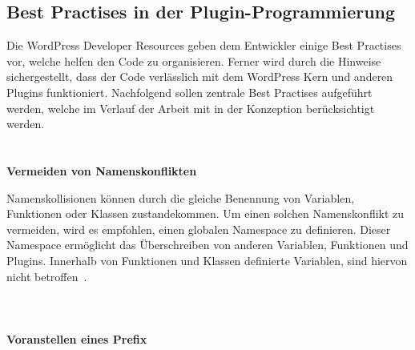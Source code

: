 \subsection{Best Practises in der Plugin-Programmierung}
Die WordPress Developer Resources geben dem Entwickler einige Best Practises vor, welche helfen den Code zu organisieren.
Ferner wird durch die Hinweise sichergestellt, dass der Code verlässlich mit dem WordPress Kern und anderen Plugins funktioniert.
Nachfolgend sollen zentrale Best Practises aufgeführt werden, welche im Verlauf der Arbeit mit in der Konzeption berücksichtigt werden.
\\
\\\\
\textbf{Vermeiden von Namenskonflikten}

Namenskollisionen können durch die gleiche Benennung von Variablen, Funktionen oder Klassen zustandekommen.
Um einen solchen Namenskonflikt zu vermeiden, wird es empfohlen, einen globalen Namespace zu definieren.
Dieser Namespace ermöglicht das Überschreiben von anderen Variablen, Funktionen und Plugins.
Innerhalb von Funktionen und Klassen definierte Variablen, sind hiervon nicht betroffen~\cite{wordpress2024Naming}.
\\
\\
\\\\
\textbf{Voranstellen eines Prefix}

